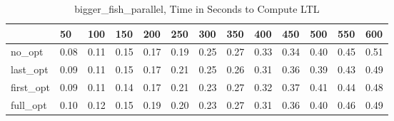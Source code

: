 \begin{table}
\caption{bigger\_fish\_parallel, Time in Seconds to Compute LTL}
\label{bigger_fish_parallel_LTL_time}
\begin{tabular}{lllllllllllll}
\toprule
 & 50 & 100 & 150 & 200 & 250 & 300 & 350 & 400 & 450 & 500 & 550 & 600 \\
\midrule
no\_opt & 0.08 & 0.11 & 0.15 & 0.17 & 0.19 & 0.25 & 0.27 & 0.33 & 0.34 & 0.40 & 0.45 & 0.51 \\
last\_opt & 0.09 & 0.11 & 0.15 & 0.17 & 0.21 & 0.25 & 0.26 & 0.31 & 0.36 & 0.39 & 0.43 & 0.49 \\
first\_opt & 0.09 & 0.11 & 0.14 & 0.17 & 0.21 & 0.23 & 0.27 & 0.32 & 0.37 & 0.41 & 0.44 & 0.48 \\
full\_opt & 0.10 & 0.12 & 0.15 & 0.19 & 0.20 & 0.23 & 0.27 & 0.31 & 0.36 & 0.40 & 0.46 & 0.49 \\
\bottomrule
\end{tabular}
\end{table}
